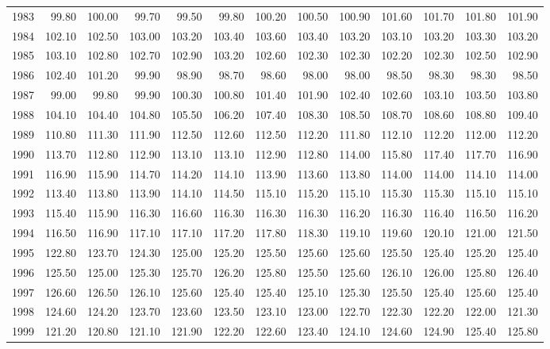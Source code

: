\begin{longtable}{rrrrrrrrrrrrr}
  1983 & 99.80 & 100.00 & 99.70 & 99.50 & 99.80 & 100.20 & 100.50 & 100.90 & 101.60 & 101.70 & 101.80 & 101.90 \\ 
  1984 & 102.10 & 102.50 & 103.00 & 103.20 & 103.40 & 103.60 & 103.40 & 103.20 & 103.10 & 103.20 & 103.30 & 103.20 \\ 
  1985 & 103.10 & 102.80 & 102.70 & 102.90 & 103.20 & 102.60 & 102.30 & 102.30 & 102.20 & 102.30 & 102.50 & 102.90 \\ 
  1986 & 102.40 & 101.20 & 99.90 & 98.90 & 98.70 & 98.60 & 98.00 & 98.00 & 98.50 & 98.30 & 98.30 & 98.50 \\ 
  1987 & 99.00 & 99.80 & 99.90 & 100.30 & 100.80 & 101.40 & 101.90 & 102.40 & 102.60 & 103.10 & 103.50 & 103.80 \\ 
  1988 & 104.10 & 104.40 & 104.80 & 105.50 & 106.20 & 107.40 & 108.30 & 108.50 & 108.70 & 108.60 & 108.80 & 109.40 \\ 
  1989 & 110.80 & 111.30 & 111.90 & 112.50 & 112.60 & 112.50 & 112.20 & 111.80 & 112.10 & 112.20 & 112.00 & 112.20 \\ 
  1990 & 113.70 & 112.80 & 112.90 & 113.10 & 113.10 & 112.90 & 112.80 & 114.00 & 115.80 & 117.40 & 117.70 & 116.90 \\ 
  1991 & 116.90 & 115.90 & 114.70 & 114.20 & 114.10 & 113.90 & 113.60 & 113.80 & 114.00 & 114.00 & 114.10 & 114.00 \\ 
  1992 & 113.40 & 113.80 & 113.90 & 114.10 & 114.50 & 115.10 & 115.20 & 115.10 & 115.30 & 115.30 & 115.10 & 115.10 \\ 
  1993 & 115.40 & 115.90 & 116.30 & 116.60 & 116.30 & 116.30 & 116.30 & 116.20 & 116.30 & 116.40 & 116.50 & 116.20 \\ 
  1994 & 116.50 & 116.90 & 117.10 & 117.10 & 117.20 & 117.80 & 118.30 & 119.10 & 119.60 & 120.10 & 121.00 & 121.50 \\ 
  1995 & 122.80 & 123.70 & 124.30 & 125.00 & 125.20 & 125.50 & 125.60 & 125.60 & 125.50 & 125.40 & 125.20 & 125.40 \\ 
  1996 & 125.50 & 125.00 & 125.30 & 125.70 & 126.20 & 125.80 & 125.50 & 125.60 & 126.10 & 126.00 & 125.80 & 126.40 \\ 
  1997 & 126.60 & 126.50 & 126.10 & 125.60 & 125.40 & 125.40 & 125.10 & 125.30 & 125.50 & 125.40 & 125.60 & 125.40 \\ 
  1998 & 124.60 & 124.20 & 123.70 & 123.60 & 123.50 & 123.10 & 123.00 & 122.70 & 122.30 & 122.20 & 122.00 & 121.30 \\ 
  1999 & 121.20 & 120.80 & 121.10 & 121.90 & 122.20 & 122.60 & 123.40 & 124.10 & 124.60 & 124.90 & 125.40 & 125.80 \\ 

\end{longtable}
